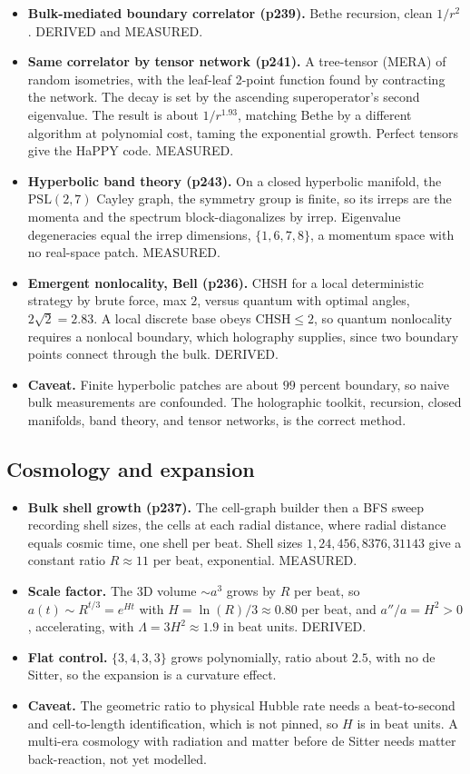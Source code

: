 \begin{itemize}
  \item \textbf{Bulk-mediated boundary correlator (p239).} Bethe recursion, clean $1/r^2$. DERIVED and MEASURED.
  \item \textbf{Same correlator by tensor network (p241).} A tree-tensor (MERA) of random isometries, with the
  leaf-leaf 2-point function found by contracting the network. The decay is set by the ascending superoperator's
  second eigenvalue. The result is about $1/r^{1.93}$, matching Bethe by a different algorithm at polynomial cost,
  taming the exponential growth. Perfect tensors give the HaPPY code. MEASURED.
  \item \textbf{Hyperbolic band theory (p243).} On a closed hyperbolic manifold, the $\mathrm{PSL}(2,7)$ Cayley
  graph, the symmetry group is finite, so its irreps are the momenta and the spectrum block-diagonalizes by irrep.
  Eigenvalue degeneracies equal the irrep dimensions, $\{1, 6, 7, 8\}$, a momentum space with no real-space patch.
  MEASURED.
  \item \textbf{Emergent nonlocality, Bell (p236).} CHSH for a local deterministic strategy by brute force, max
  $2$, versus quantum with optimal angles, $2\sqrt{2} = 2.83$. A local discrete base obeys $\mathrm{CHSH} \le 2$,
  so quantum nonlocality requires a nonlocal boundary, which holography supplies, since two boundary points
  connect through the bulk. DERIVED.
  \item \textbf{Caveat.} Finite hyperbolic patches are about $99$ percent boundary, so naive bulk measurements are
  confounded. The holographic toolkit, recursion, closed manifolds, band theory, and tensor networks, is the
  correct method.
\end{itemize}

\subsection{Cosmology and expansion}

\begin{itemize}
  \item \textbf{Bulk shell growth (p237).} The cell-graph builder then a BFS sweep recording shell sizes, the
  cells at each radial distance, where radial distance equals cosmic time, one shell per beat. Shell sizes
  $1, 24, 456, 8376, 31143$ give a constant ratio $R \approx 11$ per beat, exponential. MEASURED.
  \item \textbf{Scale factor.} The 3D volume $\sim a^3$ grows by $R$ per beat, so $a(t) \sim R^{t/3} = e^{Ht}$ with
  $H = \ln(R)/3 \approx 0.80$ per beat, and $a''/a = H^2 > 0$, accelerating, with $\Lambda = 3H^2 \approx 1.9$ in
  beat units. DERIVED.
  \item \textbf{Flat control.} $\{3,4,3,3\}$ grows polynomially, ratio about $2.5$, with no de Sitter, so the
  expansion is a curvature effect.
  \item \textbf{Caveat.} The geometric ratio to physical Hubble rate needs a beat-to-second and cell-to-length
  identification, which is not pinned, so $H$ is in beat units. A multi-era cosmology with radiation and matter
  before de Sitter needs matter back-reaction, not yet modelled.
\end{itemize}

